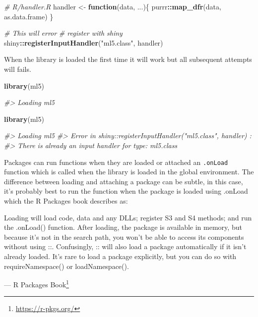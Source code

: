 \documentclass[10pt,]{krantz}
\makeatletter
\newenvironment{Shaded}{\begin{snugshade}}{\end{snugshade}}
\newcommand{\CommentTok}[1]{\textcolor[rgb]{0.37,0.37,0.37}{\textit{#1}}}
\newcommand{\ControlFlowTok}[1]{\textcolor[rgb]{0.27,0.27,0.27}{\textbf{#1}}}
\newcommand{\KeywordTok}[1]{\textcolor[rgb]{0.27,0.27,0.27}{\textbf{#1}}}
\newcommand{\NormalTok}[1]{#1}
\newcommand{\OperatorTok}[1]{\textcolor[rgb]{0.43,0.43,0.43}{\textbf{#1}}}
\newcommand{\StringTok}[1]{\textcolor[rgb]{0.5,0.5,0.5}{#1}}
\renewenvironment{quote}{\begin{VF}}{\end{VF}}
\renewcommand{\href}[2]{#2\footnote{\url{#1}}}
\newenvironment{kframe}{%
\medskip{}
\setlength{\fboxsep}{.8em}
 \def\at@end@of@kframe{}%
 \ifinner\ifhmode%
  \def\at@end@of@kframe{\end{minipage}}%
  \begin{minipage}{\columnwidth}%
 \fi\fi%
 \def\FrameCommand##1{\hskip\@totalleftmargin \hskip-\fboxsep
 \colorbox{shadecolor}{##1}\hskip-\fboxsep
     \hskip-\linewidth \hskip-\@totalleftmargin \hskip\columnwidth}%
 \MakeFramed {\advance\hsize-\width
   \@totalleftmargin\z@ \linewidth\hsize
   \@setminipage}}%
 {\par\unskip\endMakeFramed%
 \at@end@of@kframe}
\renewenvironment{Shaded}{\begin{kframe}}{\end{kframe}}
\makeatother
\begin{document}
\begin{Shaded}
\begin{Highlighting}[]
\CommentTok{# R/handler.R}
\NormalTok{handler <-}\StringTok{ }\ControlFlowTok{function}\NormalTok{(data, ...)\{}
\NormalTok{  purrr}\OperatorTok{::}\KeywordTok{map_dfr}\NormalTok{(data, as.data.frame)}
\NormalTok{\}}

\CommentTok{# This will error}
\CommentTok{# register with shiny}
\NormalTok{shiny}\OperatorTok{::}\KeywordTok{registerInputHandler}\NormalTok{(}\StringTok{"ml5.class"}\NormalTok{, handler)}
\end{Highlighting}
\end{Shaded}

When the library is loaded the first time it will work but all subsequent attempts will fails.

\begin{Shaded}
\begin{Highlighting}[]
\KeywordTok{library}\NormalTok{(ml5)}

\CommentTok{#> Loading ml5}

\KeywordTok{library}\NormalTok{(ml5)}

\CommentTok{#> Loading ml5}
\CommentTok{#> Error in shiny::registerInputHandler("ml5.class", handler) : }
\CommentTok{#>   There is already an input handler for type: ml5.class}
\end{Highlighting}
\end{Shaded}

Packages can run functions when they are loaded or attached an \texttt{.onLoad} function which is called when the library is loaded in the global environment. The difference between loading and attaching a package can be subtle, in this case, it's probably best to run the function when the package is loaded using .onLoad which the R Packages book describes as:

\begin{quote}
Loading will load code, data and any DLLs; register S3 and S4 methods; and run the .onLoad() function. After loading, the package is available in memory, but because it's not in the search path, you won't be able to access its components without using ::. Confusingly, :: will also load a package automatically if it isn't already loaded. It's rare to load a package explicitly, but you can do so with requireNamespace() or loadNamespace().
\end{quote}

--- \href{https://r-pkgs.org/}{R Packages Book}
\end{document}
